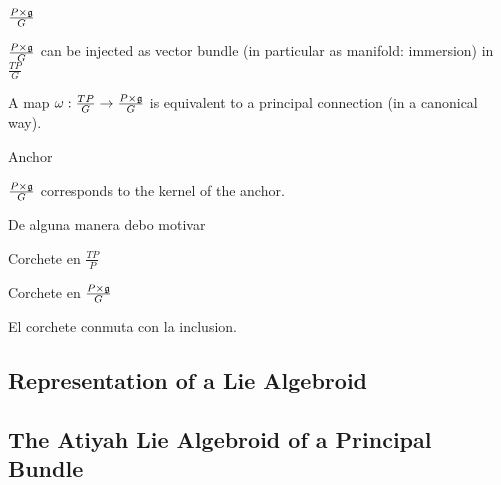 \begin{definition}
$\frac{P \times \mathfrak{g}}{G}$
\end{definition}

\begin{proposition}
$\frac{P \times \mathfrak{g}}{G}$ can be injected as vector bundle (in particular as manifold: immersion) in $\frac{TP}{G}$
\end{proposition}

\begin{theorem}
A map $\omega:\frac{TP}{G} \to \frac{P \times \mathfrak{g}}{G}$ is equivalent to a principal connection (in a canonical way).
\end{theorem}

\begin{definition}
Anchor
\end{definition}

\begin{proposition}
$\frac{P \times \mathfrak{g}}{G}$ corresponds to the kernel of the anchor.
\end{proposition}

De alguna manera debo motivar 

\begin{definition}
Corchete en $\frac{TP}{P}$
\end{definition}

\begin{definition}
Corchete en $\frac{P \times \mathfrak{g}}{G}$
\end{definition}

\begin{proposition}
El corchete conmuta con la inclusion.
\end{proposition}




\subsection{Representation of a Lie Algebroid}

\subsection{The Atiyah Lie Algebroid of a Principal Bundle}

